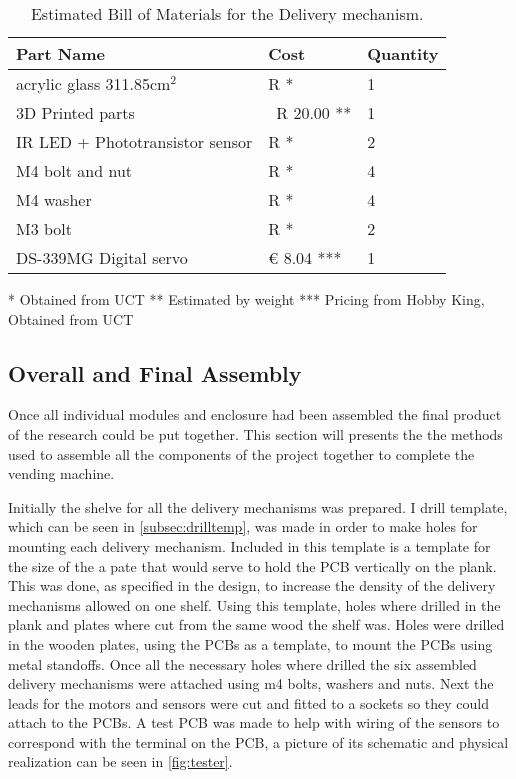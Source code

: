 \documentclass[a4paper,11pt]{article}
\numberwithin{figure}{section}
\numberwithin{table}{section}
\begin{document}
	\begin{table}[ht]
	\centering		
	\begin{tabular}{| m{8cm} | m{4cm}| m{3cm} |}
	\hline
	\textbf{Part Name} & \textbf{Cost} & \textbf{Quantity} \\
	\hline
	acrylic glass 311.85cm$^2$ & R * & 1 \\
	\hline
	3D Printed parts & ~R 20.00 ** & 1 \\
	\hline
	IR LED + Phototransistor sensor & R * & 2 \\
	\hline
	M4 bolt and nut & R * & 4 \\
	\hline 
	M4 washer & R * & 4 \\
	\hline	
	M3 bolt & R * & 2 \\
	\hline
	DS-339MG Digital servo & \euro{} 8.04 *** & 1 \\
	\hline
	\end{tabular}
	
	 * Obtained from UCT
	 ** Estimated by weight
	 *** Pricing from Hobby King, Obtained from UCT
	\caption{Estimated Bill of Materials for the Delivery mechanism. \label{tab:bomdel}}
	\end{table}	

\subsection{Overall and Final Assembly}
\label{subsec:finbuild}
Once all individual modules and enclosure had been assembled the final product of the research could be put together. This section will presents the the methods used to assemble all the components of the project together to complete the vending machine.

Initially the shelve for all the delivery mechanisms was prepared. I drill template, which can be seen in \autoref{subsec:drilltemp}, was made in order to make holes for mounting each delivery mechanism. Included in this template is a template for the size of the a pate that would serve to hold the PCB vertically on the plank. This was done, as specified in the design, to increase the density of the delivery mechanisms allowed on one shelf. Using this template, holes where drilled in the plank and plates where cut from the same wood the shelf was. Holes were drilled in the wooden plates, using the PCBs as a template, to mount the PCBs using metal standoffs. Once all the necessary holes where drilled the six assembled delivery mechanisms were attached using m4 bolts, washers and nuts. Next the leads for the motors and sensors were cut and fitted to a sockets so they could attach to the PCBs. A test PCB was made to help with wiring of the sensors to correspond with the terminal on the PCB, a picture of its schematic and physical realization can be seen in \autoref{fig:tester}.
\end{document}
